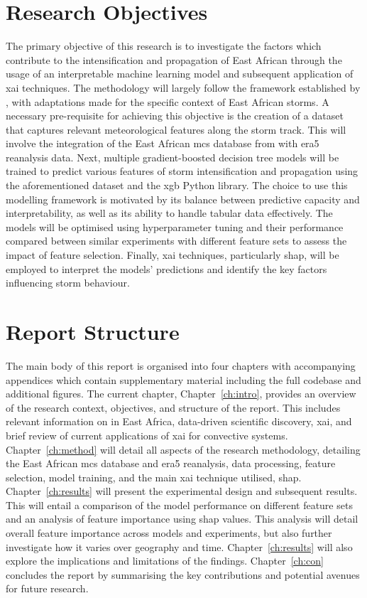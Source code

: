 \section{Research Objectives}

The primary objective of this research is to investigate the factors which contribute to the intensification and propagation of East African  through the usage of an interpretable machine learning model and subsequent application of \acrshort{xai} techniques. The methodology will largely follow the framework established by \cite{Hunt2024}, with adaptations made for the specific context of East African storms. A necessary pre-requisite for achieving this objective is the creation of a dataset that captures relevant meteorological features along the storm track. This will involve the integration of the East African \acrshort{mcs} database from \cite{Hill2023} with \acrshort{era5} reanalysis data. Next, multiple gradient-boosted decision tree models will be trained to predict various features of storm intensification and propagation using the aforementioned dataset and the \acrfull{xgb} Python library. The choice to use this modelling framework is motivated by its balance between predictive capacity and interpretability, as well as its ability to handle tabular data effectively. The models will be optimised using hyperparameter tuning and their performance compared between similar experiments with different feature sets to assess the impact of feature selection. Finally, \acrshort{xai} techniques, particularly \acrshort{shap}, will be employed to interpret the models' predictions and identify the key factors influencing storm behaviour.

\section{Report Structure}

The main body of this report is organised into four chapters with accompanying appendices which contain supplementary material including the full codebase and additional figures. The current chapter, Chapter~\ref{ch:intro}, provides an overview of the research context, objectives, and structure of the report. This includes relevant information on  in East Africa, data-driven scientific discovery, \acrfull{xai}, and brief review of current applications of \acrshort{xai} for convective systems. Chapter~\ref{ch:method} will detail all aspects of the research methodology, detailing the East African \acrshort{mcs} database and \acrshort{era5} reanalysis, data processing, feature selection, model training, and the main \acrshort{xai} technique utilised, \acrshort{shap}. Chapter~\ref{ch:results} will present the experimental design and subsequent results. This will entail a comparison of the model performance on different feature sets and an analysis of feature importance using \acrshort{shap} values. This analysis will detail overall feature importance across models and experiments, but also further investigate how it varies over geography and time. Chapter~\ref{ch:results} will also explore the implications and limitations of the findings. Chapter~\ref{ch:con} concludes the report by summarising the key contributions and potential avenues for future research.